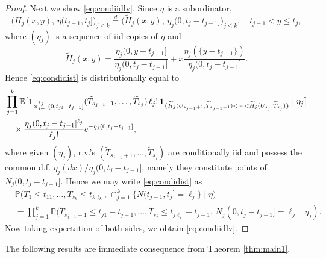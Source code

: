 \documentclass[11pt,leqno%
]{amsart}
\newcommand{\wt}{\widetilde}
\newcommand{\E }{{\mathbb E}}
\renewcommand{\P }{{\mathbb P}}
\newcommand{\1}{{\mathbf 1}}
\begin{document}
\begin{proof}
 Next we show \eqref{eq:condiidlv}. Since $\eta$ is a subordinator,
\[
 \big(
 H_j(x,y),\,\eta(t_{j-1},t_j]
\big)_{j\le k} \stackrel{d}{=} \big(\wt
 H_j(x,y),\,\eta_j(0,t_j-t_{j-1}]\big)_{j\le k},\quad t_{j-1}<y \le t_j,%
\] 
 where $(\eta_j)$ is a sequence of iid copies of $\eta$ and 
 \[
  \wt H_j(x,y) = \frac{\eta_j(0,y-t_{j-1}]}{\eta_j(0,t_j-t_{j-1}]}+ x
 \frac{\eta_j(\{y-t_{j-1}\})}{\eta_j(0,t_j-t_{j-1}]}. 
 \]
 Hence \eqref{eq:condidist} is distributionally equal to 
 \begin{align*}
  & \prod_{j=1}^k \E \big[
 {\bf 1}_{\times_{i=1}^{\ell_j}(0,t_{ji}-t_{j-1}]}(\wt
  T_{s_{j-1}+1},\ldots,\wt T_{s_j})\,\ell_j!\, {\bf
  1}_{\{\wt H_j(U_{s_{j-1}+1},\wt T_{s_{j-1}+1})< \cdots< \wt H_j(U_{s_j},\wt
  T_{s_j})\} } \mid \eta_j
 \big] \\
 &\quad \times \frac{\eta_j(0,t_j-t_{j-1}]^{\ell_j}}{\ell_j!}
  e^{-\eta_j(0,t_j-t_{j-1}]},  
 \end{align*}
where given $(\eta_j)$, r.v.'s $(\wt T_{s_{j-1}+1},\ldots,\wt T_{s_j})$
 are conditionally iid and possess the common
 d.f. $\eta_j(dx)/\eta_j(0,t_j-t_{j-1}]$, namely they constitute points
 of $N_j(0,t_j-t_{j-1}]$.  Hence we may write \eqref{eq:condidist} as  
 \begin{align*}
 & \P\big(
 T_1 \le t_{11},\ldots,T_{s_k} \le
  t_{k\ell_k},\,\cap_{j=1}^k \{ N(t_{j-1},t_j]=\ell_j \}\mid
  \eta 
 \big) \\ 
 & = \prod_{j=1}^k 
\P (\wt T_{s_{j-1}+1}\le t_{j1}-t_{j-1},%
 \ldots, \wt T_{s_j}\le t_{j\ell_j}-t_{j-1},\,
N_j (0,t_j-t_{j-1}]= \ell_j \mid \eta_j ). 
 \end{align*}
 Now taking expectation of both sides, we obtain \eqref{eq:condiidlv}. 
\end{proof}

The following results are immediate consequence from Theorem
\ref{thm:main1}.
\end{document}

